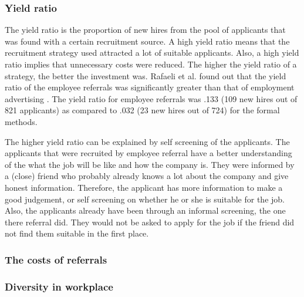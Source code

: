 \documentclass[Main.tex]{subfiles}
\begin{document}
\subsubsection*{Yield ratio}
The yield ratio is the proportion of new hires from the pool of applicants that was found with a certain recruitment source. A high yield ratio means that the recruitment strategy used attracted a lot of suitable applicants. Also, a high yield ratio implies that unnecessary costs were reduced. The higher the yield ratio of a strategy, the better the investment was. 
Rafaeli et al. found out that the yield ratio of the employee referrals was significantly greater than that of employment advertising \cite{fourth}. The yield ratio for employee referrals was .133 (109 new
hires out of 821 applicants) as compared to .032 (23 new hires out of 724) for the formal methods. 

The higher yield ratio can be explained by self screening of the applicants. The applicants that were recruited by employee referral have a better understanding of the what the job will be like and how the company is. They were informed by a (close) friend who probably already knows a lot about the company and give honest information. Therefore, the applicant has more information to make a good judgement, or self screening on whether he or she is suitable for the job. Also, the applicants already have been through an informal screening, the one there referral did. They would not be asked to apply for the job if the friend did not find them suitable in the first place. 

\subsubsection*{The costs of referrals}

\subsubsection*{Diversity in workplace}
\end{document}
